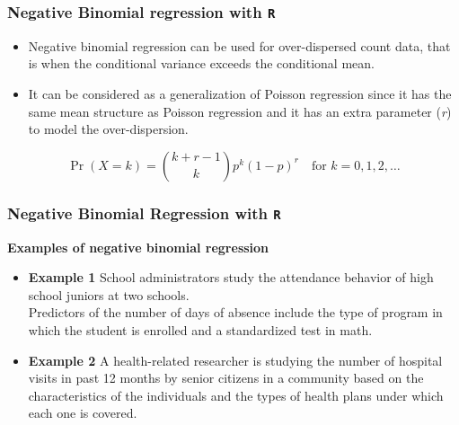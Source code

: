 \documentclass[MASTER.tex]{subfiles}
\begin{document}
\begin{frame}[fragile]
	\frametitle{Negative Binomial regression with \texttt{R}}
	\large	
	\begin{itemize}
		\item Negative binomial regression can be used for over-dispersed count data, that is when the conditional 
		variance exceeds the conditional mean. 
		\item It can be considered as a generalization of Poisson regression since it has the same mean structure as Poisson 	
		regression and it has an extra parameter (\textit{r}) to model the over-dispersion. 
	\end{itemize}
	\[\Pr(X = k) = {k+r-1 \choose k} p^k(1-p)^r \quad\text{for }k = 0, 1, 2, \dots \]
	
\end{frame}
\begin{frame}[fragile]
	\frametitle{Negative Binomial Regression with \texttt{R} }
	\large
	
\textbf{Examples of negative binomial regression}
\begin{itemize}
\item \textbf{Example 1}  School administrators study the attendance behavior of high school juniors at two schools. \\ Predictors of the number of days of absence include the type of program in which the student is enrolled and a standardized test in math.

\item \textbf{Example 2}  A health-related researcher is studying the number of hospital visits in past 12 months by senior citizens in a community based on the characteristics of the individuals and the types of health plans under which each one is covered.
\end{itemize}
\end{frame}
\end{document}
